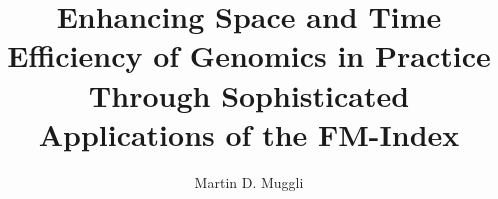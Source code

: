 \documentclass[doctor]{thesis}
\title{Enhancing Space and Time Efficiency of Genomics in Practice Through Sophisticated Applications of the FM-Index}
\author{Martin D. Muggli}
\begin{document}
 
\frontmatter 
\maketitle
\makemycopyright
\makeabstract
\makeacknowledgements   

\newpage

\tableofcontents
\mainmatter 
\end{document}
